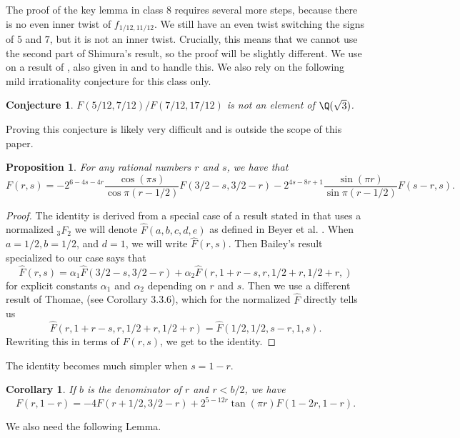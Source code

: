\documentclass[12pt]{amsart}
\newtheorem{proposition}[theorem]{Proposition}
\newtheorem{corollary}[theorem]{Corollary}
\newtheorem{Conjecture}[theorem]{Conjecture}
\theoremstyle{definition}
\theoremstyle{remark}
\begin{document}
The proof of the key lemma in class 8 requires several more steps, because there is no even inner twist of $f_{1/12,11/12}$. We still have an even twist switching the signs of $5$ and $7$, but it is not an inner twist. Crucially, this means that we cannot use the second part of Shimura's result, so the proof will be slightly different. We use on a result of \cite{thomae}, also given in \cite{bailey} and \cite{coxeter} to handle this. We also rely on the following mild irrationality conjecture for this class only.

\begin{Conjecture}\label{con}
    $F(5/12,7/12)/F(7/12,17/12)$ is not an element of $\Q(\sqrt{3})$.
\end{Conjecture}

Proving this conjecture is likely very difficult and is outside the scope of this paper.

\begin{proposition}\label{thomae}
   For any rational  numbers $r$ and $s$, we have that   $$F(r,s)=-2^{6-4s-4r}\frac{\cos(\pi s)}{\cos\pi(r-1/2)} F(3/2-s,3/2-r)-2^{4s-8r+1}\frac{\sin(\pi r)}{\sin\pi(r-1/2)}F(s-r,s).$$
\end{proposition}


\begin{proof}
The identity is derived from a special case of a result stated in \cite{bailey} that uses a normalized ${}_3F_2$ we will denote $\hat{F}(a,b,c,d,e)$ as defined in Beyer et al. \cite{coxeter}. When $a=1/2,b=1/2$, and $d=1$, we will write $\hat{F}(r,s)$. Then Bailey's result specialized to our case says that $$\hat{F}(r,s)=\alpha_1\hat{F}(3/2-s,3/2-r)+\alpha_2\hat{F}({{r}, {1 + r - s}, {r}, {1/2 + r}, {1/2 + r},})$$ for explicit constants $\alpha_1$ and $\alpha_2$ depending on $r$ and $s$. Then we use a different result of Thomae, (see \cite{aar} Corollary 3.3.6), which for the normalized $\hat{F}$ directly tells us $$\hat{F}({{r}, {1 + r - s}, {r}, {1/2 + r}, {1/2 + r}})=\hat{F}({{1/2}, {1/2}, {s-r}, {1 }, {s}}).$$ Rewriting this in terms of $F(r,s)$, we get to the identity.
\end{proof}

The identity becomes much simpler when $s=1-r$.

\begin{corollary}\label{cor}
   If $b$ is the denominator of $r$ and $r<b/2$, we have $$F(r,1-r)=-4F(r+1/2,3/2-r)+2^{5-12r}\tan(\pi r)F(1-2r,1-r).$$
\end{corollary}

We also need the following Lemma.
\end{document}
